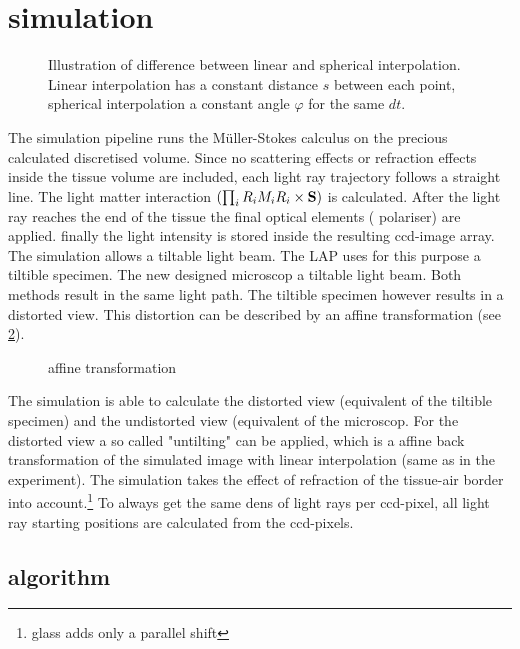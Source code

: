 \section{simulation}
\label{sec:simulation}
% 
\begin{figure}[!t]
\centering
\def\tikzwidth{0.75*\textwidth}
\tikzset{external/export=false}
\caption[Illustration linear and spherical interpolation.]{Illustration of difference between linear and spherical interpolation. Linear interpolation has a constant distance $s$ between each point, spherical interpolation a constant angle $\varphi$ for the same $dt$.}
\label{fig:vectorfield_disc}
\end{figure}
% 
The simulation pipeline runs the M\"uller-Stokes calculus on the precious calculated discretised volume.
Since no scattering effects or refraction effects inside the tissue volume are included, each light ray trajectory follows a straight line.
The light matter interaction $\left( \prod_i R_i M_i R_i \times \mathbf{S} \right)$ is calculated. 
After the light ray reaches the end of the tissue the final optical elements (\eg{} polariser) are applied.
finally the light intensity is stored inside the resulting ccd-image array.\\
% 
The simulation allows a tiltable light beam.
The \ac{LAP} uses for this purpose a tiltible specimen.
The new designed microscop a tiltable light beam.
Both methods result in the same light path.
The tiltible specimen however results in a distorted view.
This distortion can be described by an affine transformation (see \cref{fig::affine_transformation}).
% 
\begin{figure}[!t]
\centering

\caption{affine transformation}
\label{fig::affine_transformation}
\end{figure}
% 
The simulation is able to calculate the distorted view (equivalent of the tiltible specimen) and the undistorted view (equivalent of the microscop. 
For the distorted view a so called "untilting" can be applied, which is a affine back transformation of the simulated image with linear interpolation (same as in the experiment).
% 
The simulation takes the effect of refraction of the tissue-air border into account.\footnote{glass adds only a parallel shift}
% 
To always get the same dens of light rays per ccd-pixel, all light ray starting positions are calculated from the ccd-pixels.
% 
\subsection{algorithm}
% 
